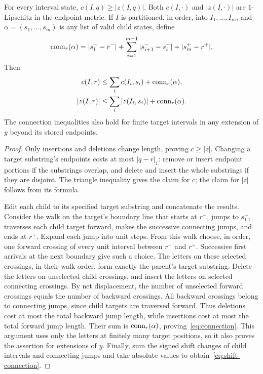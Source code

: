 \begin{lemma}\label{lem:geometry}
For every interval state, $c(I,q)\ge |z(I,q)|$. Both $c(I,\cdot)$ and
$|z(I,\cdot)|$ are $1$-Lipschitz in the endpoint metric.
If $I$ is partitioned, in order, into $I_1,\ldots,I_m$, and
$\alpha=(s_1,\ldots,s_m)$ is any list of valid child states, define
\[
 \operatorname{conn}_r(\alpha)=|s_1^--r^-|
   +\sum_{i=1}^{m-1}|s_{i+1}^--s_i^+|+|s_m^+-r^+|.
\]
Then
\begin{align}
 c(I,r)&\le\sum_i c(I_i,s_i)+\operatorname{conn}_r(\alpha),\label{eq:connection}\\
 |z(I,r)|&\le\sum_i|z(I_i,s_i)|+\operatorname{conn}_r(\alpha).
 \label{eq:shift-connection}
\end{align}
The connection inequalities also hold for finite target intervals in any
extension of $y$ beyond its stored endpoints.
\end{lemma}
\begin{proof}
Only insertions and deletions change length, proving $c\ge|z|$.
Changing a target substring's endpoints costs at most $|q-r|_1$:
remove or insert endpoint portions if the substrings overlap, and delete
and insert the whole substrings if they are disjoint. The triangle
inequality gives the claim for $c$; the claim for $|z|$ follows from its
formula.

Edit each child to its specified target substring and concatenate the
results. Consider the walk on the target's boundary line that starts at
$r^-$, jumps to $s_1^-$, traverses each child target forward, makes the
successive connecting jumps, and ends at $r^+$. Expand each jump into unit
steps. From this walk choose, in order, one forward crossing of every unit
interval between $r^-$ and $r^+$. Successive first arrivals at the next
boundary give such a choice. The letters on these selected crossings,
in their walk order, form exactly the parent's target substring. Delete
the letters on unselected child crossings, and insert the letters on
selected connecting crossings. By net displacement, the number of
unselected forward crossings equals the number of backward crossings.
All backward crossings belong to connecting jumps, since child targets
are traversed forward. Thus deletions cost at most the total backward
jump length, while insertions cost at most the total forward jump length.
Their sum is $\operatorname{conn}_r(\alpha)$, proving~\eqref{eq:connection}.
This argument uses only the letters at finitely many target positions,
so it also proves the assertion for extensions of $y$.
Finally, sum the signed shift changes of child intervals and connecting
jumps and take absolute values to obtain~\eqref{eq:shift-connection}.
\end{proof}

